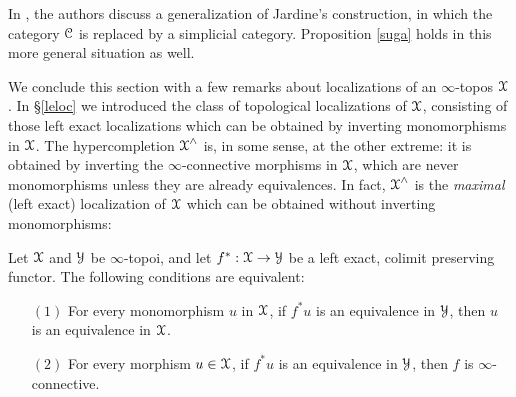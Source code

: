 \begin{remark}
In \cite{toen}, the authors discuss a generalization of Jardine's construction, in which
the category $\operatorname{\mathcal{C}}$ is replaced by a simplicial category. Proposition \ref{suga} holds in this more general situation as well.
\end{remark}

We conclude this section with a few remarks about localizations of an $\infty$-topos
$\operatorname{\mathcal{X}}$. In \S \ref{leloc} we introduced the class of topological localizations of $\operatorname{\mathcal{X}}$, consisting of those left exact localizations which can be obtained by inverting monomorphisms in $\operatorname{\mathcal{X}}$.
The hypercompletion $\operatorname{\mathcal{X}}^{\wedge}$ is, in some sense, at the other extreme: it is obtained by
inverting the $\infty$-connective morphisms in $\operatorname{\mathcal{X}}$, which are never monomorphisms unless they are already equivalences. In fact, $\operatorname{\mathcal{X}}^{\wedge}$ is the {\em maximal} (left exact) localization of $\operatorname{\mathcal{X}}$ which can be obtained without inverting monomorphisms:

\begin{proposition}\label{antitopchar}
Let $\operatorname{\mathcal{X}}$ and $\operatorname{\mathcal{Y}}$ be $\infty$-topoi, and let $f^{\ast}: \operatorname{\mathcal{X}} \rightarrow \operatorname{\mathcal{Y}}$ be a left exact, colimit preserving functor.
The following conditions are equivalent:
\begin{itemize}
\item[$(1)$] For every monomorphism $u$ in $\operatorname{\mathcal{X}}$, if $f^{\ast} u$ is an equivalence in $\operatorname{\mathcal{Y}}$, then
$u$ is an equivalence in $\operatorname{\mathcal{X}}$.
\item[$(2)$] For every morphism $u \in \operatorname{\mathcal{X}}$, if $f^{\ast} u$ is an equivalence in $\operatorname{\mathcal{Y}}$, then $f$ is $\infty$-connective.
\end{itemize}
\end{proposition}

